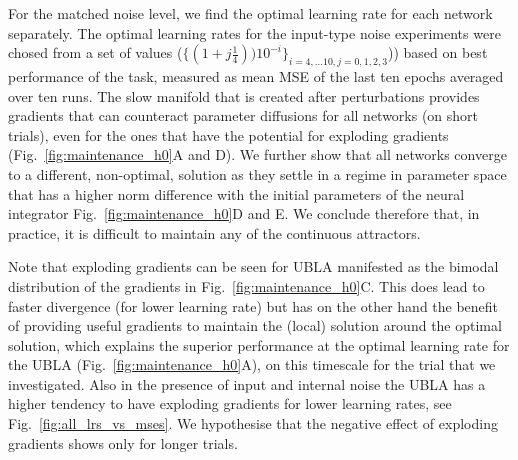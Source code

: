 \documentclass{article} %
\newcounter{ct}
\theoremstyle{definition}
\theoremstyle{remark}
\begin{document}
For the matched noise level, we find the optimal learning rate for each network separately.
The optimal learning rates for the input-type noise experiments were chosed from a set of values 
($\{(1+j\frac{1}{4}))10^{-i}\}_{i=4,\dots 10, j=0,1,2,3}$))  based on best performance of the task, measured as mean MSE of the last ten epochs averaged over ten runs.
The slow manifold that is created after perturbations provides gradients that can counteract parameter diffusions for all networks (on short trials), even for the ones that have the potential for exploding gradients (Fig.~\ref{fig:maintenance_h0}A and D).
 We further show that all networks converge to a different, non-optimal, solution as they settle in a regime in parameter space that has a higher norm difference with the initial parameters of the neural integrator Fig.~\ref{fig:maintenance_h0}D and E.
 We conclude therefore that, in practice, it is difficult to maintain any of the continuous attractors.

Note that exploding gradients can be seen for UBLA manifested as the bimodal distribution of the gradients in Fig.~\ref{fig:maintenance_h0}C. This does lead to faster divergence (for lower learning rate) but has on the other hand the benefit of providing useful gradients to maintain the (local) solution around the optimal solution, which explains the superior performance at the optimal learning rate for the UBLA (Fig.~\ref{fig:maintenance_h0}A), on this timescale for the trial that we investigated.
Also in the presence of input and internal noise the UBLA has a higher tendency to have exploding gradients for lower learning rates, see Fig.~\ref{fig:all_lrs_vs_mses}. 
We hypothesise that the negative effect of exploding gradients shows only for longer trials.
\end{document}
